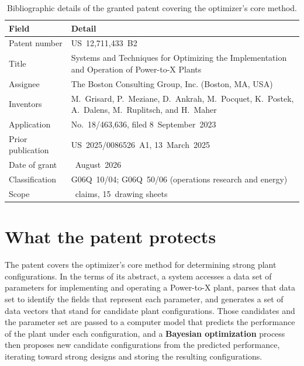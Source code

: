 \begin{table}[H]
  \centering
  \small
  \begin{tabularx}{\linewidth}{@{}>{\raggedright\arraybackslash}p{3.4cm} >{\raggedright\arraybackslash}X@{}}
    \toprule
    \textbf{Field} & \textbf{Detail} \\
    \midrule
    Patent number & US~12,711,433~B2 \\
    \addlinespace
    Title & Systems and Techniques for Optimizing the Implementation and
      Operation of Power-to-X Plants \\
    \addlinespace
    Assignee & The Boston Consulting Group, Inc. (Boston, MA, USA) \\
    \addlinespace
    Inventors & M.~Grisard, P.~Meziane, D.~Ankrah, M.~Pocquet, K.~Postek,
      A.~Dalens, M.~Ruplitsch, and H.~Maher \\
    \addlinespace
    Application & No.~18/463,636, filed 8~September~2023 \\
    \addlinespace
    Prior publication & US~2025/0086526~A1, 13~March~2025 \\
    \addlinespace
    Date of grant & 18~August~2026 \\
    \addlinespace
    Classification & G06Q~10/04; G06Q~50/06 (operations research and energy) \\
    \addlinespace
    Scope & 24~claims, 15~drawing sheets \\
    \bottomrule
  \end{tabularx}
  \caption{Bibliographic details of the granted patent covering the optimizer's
    core method.}
  \label{tab:patent}
\end{table}

\section*{What the patent protects}

The patent covers the optimizer's core method for determining strong plant
configurations. In the terms of its abstract, a system accesses a data set of
parameters for implementing and operating a Power-to-X plant, parses that data
set to identify the fields that represent each parameter, and generates a set of
data vectors that stand for candidate plant configurations. Those candidates and
the parameter set are passed to a computer model that predicts the performance of
the plant under each configuration, and a \textbf{Bayesian optimization} process
then proposes new candidate configurations from the predicted performance,
iterating toward strong designs and storing the resulting configurations.

